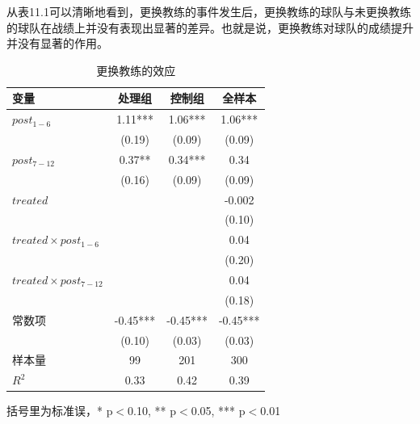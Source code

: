 \documentclass[cn,12pt,math=newtx,citestyle=gb7714-2015,bibstyle=gb7714-2015]{elegantbook}
\begin{document}
	    从表11.1可以清晰地看到，更换教练的事件发生后，更换教练的球队与未更换教练的球队在战绩上并没有表现出显著的差异。也就是说，更换教练对球队的成绩提升并没有显著的作用。
	    
	    	\begin{table}[htbp]\centering
	    	\scriptsize
	    	\caption{更换教练的效应}
	    	\label{eventstudy}
	    	\begin{center}
	    		\begin{threeparttable}
	    			\begin{tabular}{lccc}
	    				\toprule
	    			\textbf{变量}&\textbf{处理组}&\textbf{控制组}&\textbf{全样本}\\
	    				\midrule
	    				$post_{1-6}$               &      1.11***&1.06***&   1.06***   \\
	    				                                     &    (0.19)   &(0.09)   &     (0.09)         \\
	    				$post_{7-12}$ &   0.37**  &    0.34*** &0.34  \\
	    				                        &    (0.16)     &(0.09)      &(0.09)         \\
	    				$treated$       &    &  &-0.002   \\
	    				                      &    &  &(0.10)\\
	    				$treated \times post_{1-6}$  &&&0.04 \\
	    				                      &    &  & (0.20)\\
	    				$treated \times post_{7-12}$  &    &  &0.04\\
	    					&    &  &(0.18)\\
	    				常数项     & -0.45***  &-0.45***&-0.45*** \\
	    				               &    (0.10)     &(0.03)      &(0.03)         \\
	    				样本量   & 99 &201&300 \\
	    					$R^2$    &0.33&0.42&0.39
	    				\\
	    				\bottomrule
	    			\end{tabular}
	    			\begin{tablenotes}
	    				\tiny
	    				\item 括号里为标准误，* p$<$0.10, ** p$<$0.05, *** p$<$0.01
	    			\end{tablenotes}
	    		\end{threeparttable}
	    	\end{center}
	    \end{table}
	    
\end{document}
